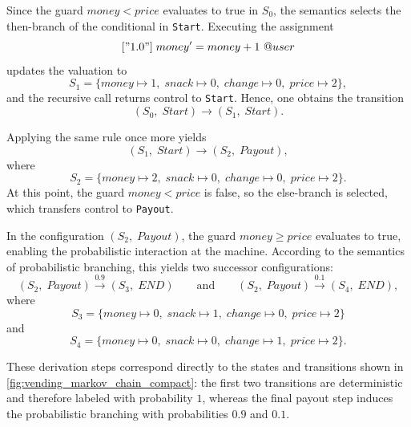 Since the guard $money < price$ evaluates to true in $S_0$, the semantics selects the then-branch of the conditional in \texttt{Start}. Executing the assignment
\[
["1.0"]\; money' = money + 1~@user
\]
updates the valuation to
\[
S_1 = \{ money \mapsto 1,\; snack \mapsto 0,\; change \mapsto 0,\; price \mapsto 2 \},
\]
and the recursive call returns control to \texttt{Start}. Hence, one obtains the transition
\[
(S_0,\; Start) \longrightarrow (S_1,\; Start).
\]

Applying the same rule once more yields
\[
(S_1,\; Start) \longrightarrow (S_2,\; Payout),
\]
where
\[
S_2 = \{ money \mapsto 2,\; snack \mapsto 0,\; change \mapsto 0,\; price \mapsto 2 \}.
\]
At this point, the guard $money < price$ is false, so the else-branch is selected, which transfers control to \texttt{Payout}.

In the configuration $(S_2,\; Payout)$, the guard $money \geq price$ evaluates to true, enabling the probabilistic interaction at the machine. According to the semantics of probabilistic branching, this yields two successor configurations:
\[
(S_2,\; Payout) \xrightarrow{0.9} (S_3,\; END)
\qquad\text{and}\qquad
(S_2,\; Payout) \xrightarrow{0.1} (S_4,\; END),
\]
where
\[
S_3 = \{ money \mapsto 0,\; snack \mapsto 1,\; change \mapsto 0,\; price \mapsto 2 \}
\]
and
\[
S_4 = \{ money \mapsto 0,\; snack \mapsto 0,\; change \mapsto 1,\; price \mapsto 2 \}.
\]

These derivation steps correspond directly to the states and transitions shown in \cref{fig:vending_markov_chain_compact}: the first two transitions are deterministic and therefore labeled with probability $1$, whereas the final payout step induces the probabilistic branching with probabilities $0.9$ and $0.1$.

